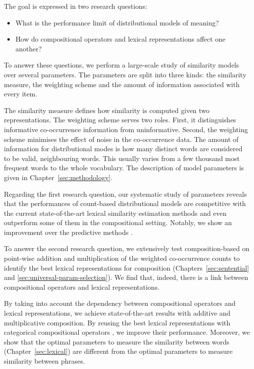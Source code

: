 The goal is expressed in two research questions:
\begin{itemize}
\item What is the performance limit of distributional models of meaning?
\item How do compositional operators and lexical representations affect one another?
\end{itemize}

To answer these questions, we perform a large-scale study of similarity models over several parameters. The parameters are split into three kinds: the similarity measure, the weighting scheme and the amount of information associated with every item.

The similarity measure defines how similarity is computed given two representations. The weighting scheme serves two roles. First, it distinguishes informative co-occurrence information from uninformative. Second, the weighting scheme minimises the effect of noise in the co-occurrence data. The amount of information for distributional modes is how many distinct words are considered to be valid, neighbouring words. This usually varies from a few thousand most frequent words to the whole vocabulary.  The description of model parameters is given in Chapter~\ref{sec:methodology}.

Regarding the first research question, our systematic study of parameters reveals that the performances of count-based distributional models are competitive with the current state-of-the-art lexical similarity estimation methods and even outperform some of them in the compositional setting. Notably, we show an improvement over the predictive methods \cite{mikolov2013linguistic,mikolov2013distributed,mikolov2013efficient}.

To answer the second research question, we extensively test composition-based on point-wise addition and multiplication of the weighted co-occurrence counts to identify the best lexical representations for composition (Chapters~\ref{sec:sentential} and \ref{sec:universal-param-selection}). We find that, indeed, there is a link between compositional operators and lexical representations.
% 
% 

By taking into account the dependency between compositional operators and lexical representations,  we achieve state-of-the-art results with additive and multiplicative composition. By reusing the best lexical representations with categorical compositional operators \cite{DBLP:journals/corr/abs-1003-4394}, we improve their performance. Moreover, we show that the optimal parameters to measure the similarity between words (Chapter~\ref{sec:lexical}) are different from the optimal parameters to measure similarity between phrases.

